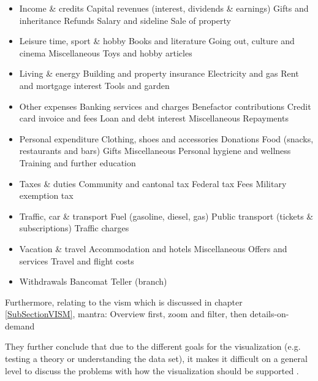 \begin{itemize}[noitemsep,nolistsep]
 

	\item Income \& credits
		\subitem Capital revenues (interest, dividends \& earnings)
		\subitem Gifts and inheritance
		\subitem Refunds
		\subitem Salary and sideline
		\subitem Sale of property
	\item Leisure time, sport \& hobby
		\subitem Books and literature
		\subitem Going out, culture and cinema
		\subitem Miscellaneous
		\subitem Toys and hobby articles
	\item Living \& energy
		\subitem Building and property insurance
		\subitem Electricity and gas
		\subitem Rent and mortgage interest
		\subitem Tools and garden
	\item Other expenses
		\subitem Banking services and charges
		\subitem Benefactor contributions
		\subitem Credit card invoice and fees
		\subitem Loan and debt interest
		\subitem Miscellaneous
		\subitem Repayments
	\item Personal expenditure
		\subitem Clothing, shoes and accessories
		\subitem Donations
		\subitem Food (snacks, restaurants and bars)
		\subitem Gifts
		\subitem Miscellaneous
		\subitem Personal hygiene and wellness
		\subitem Training and further education
	\item Taxes \& duties
		\subitem Community and cantonal tax
		\subitem Federal tax
		\subitem Fees
		\subitem Military exemption tax
	\item Traffic, car \& transport
		\subitem Fuel (gasoline, diesel, gas)
		\subitem Public transport (tickets \& subscriptions)
		\subitem Traffic charges
	\item Vacation \& travel
		\subitem Accommodation and hotels
		\subitem Miscellaneous
		\subitem Offers and services
		\subitem Travel and flight costs
	\item Withdrawals
		\subitem Bancomat
		\subitem Teller (branch)
\end{itemize}


Furthermore, relating to the \gls{vism} which is discussed in chapter \ref{SubSectionVISM}, 
mantra: Overview first, zoom and filter, then details-on-demand

They further conclude that due to the different goals for the visualization (e.g. testing a theory or understanding the data set), it makes it difficult on a general level to discuss the problems with how the visualization should be supported \citep{Stone1994}.


